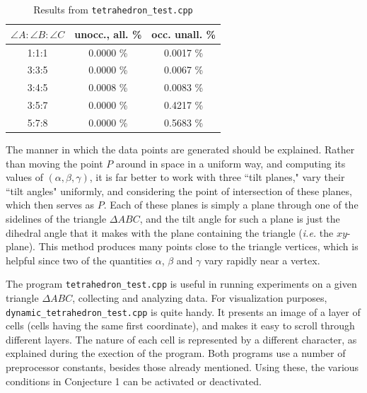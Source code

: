 \documentclass[a4paper, twoside]{article}
\begin{document}
\begin{table}

\centering

\begin{tabular}{c|c|c}

$\angle A : \angle B : \angle C$ & unocc., all. \% & occ. unall. \% \\

\hline

1:1:1 & 0.0000 \% & 0.0017 \% \\ 
3:3:5 & 0.0000 \% & 0.0067 \% \\ 
3:4:5 & 0.0008 \% & 0.0083 \% \\ 
3:5:7 & 0.0000 \% & 0.4217 \% \\ 
5:7:8 & 0.0000 \% & 0.5683 \% 

\end{tabular} 

\caption{Results from {\tt tetrahedron\_test.cpp}} 

\end{table} 


The manner in which the data points are generated should be explained. Rather than moving the point $P$ around in space in a uniform way, and computing its values of $(\alpha, \beta, \gamma)$, it is far better to work with three ``tilt planes," vary their ``tilt angles" uniformly, and considering the point of intersection of these planes, which then serves as $P$. Each of these planes is simply a plane through one of the sidelines of the triangle $\Delta ABC$, and the tilt angle for such a plane is just the dihedral angle that it makes with the plane containing the triangle ({\it i.e.} the $xy$-plane). This method produces many points close to the triangle vertices, which is helpful since two of the quantities $\alpha$, $\beta$ and $\gamma$ vary rapidly near a vertex. 

The program {\tt tetrahedron\_test.cpp} is useful in running experiments on a given triangle $\Delta ABC$, collecting and analyzing data. For visualization purposes, {\tt dynamic\_tetrahedron\_test.cpp} is quite handy. It presents an image of a layer of cells (cells having the same first coordinate), and makes it easy to scroll through different layers. The nature of each cell is represented by a different character, as explained during the exection of the program. Both programs use a number of preprocessor constants, besides those already mentioned. Using these, the various conditions in Conjecture 1 can be activated or deactivated. 
\end{document}
